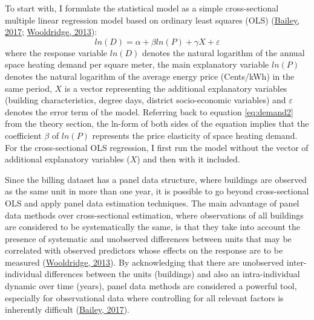 \documentclass[12pt,twoside]{reedthesis}
\begin{document}
To start with, I formulate the statistical model as a simple cross-sectional multiple linear regression model based on ordinary least squares (OLS) (\protect\hyperlink{ref-bailey17}{Bailey, 2017}; \protect\hyperlink{ref-wooldridge13}{Wooldridge, 2013}):
\begin{equation}
ln(D) = \alpha + \beta ln(P) + \gamma X + \varepsilon
\label{eq:ols-eq}
\end{equation}
where the response variable \(ln(D)\) denotes the natural logarithm of the annual space heating demand per square meter, the main explanatory variable \(ln(P)\) denotes the natural logarithm of the average energy price (Cents/kWh) in the same period, \(X\) is a vector representing the additional explanatory variables (building characteristics, degree days, district socio-economic variables) and \(\varepsilon\) denotes the error term of the model. Referring back to equation \eqref{eq:demand2} from the theory section, the ln-form of both sides of the equation implies that the coefficient \(\beta\) of \(ln(P)\) represents the price elasticity of space heating demand. For the cross-sectional OLS regression, I first run the model without the vector of additional explanatory variables (\(X\)) and then with it included.

Since the billing dataset has a panel data structure, where buildings are observed as the same unit in more than one year, it is possible to go beyond cross-sectional OLS and apply panel data estimation techniques. The main advantage of panel data methods over cross-sectional estimation, where observations of all buildings are considered to be systematically the same, is that they take into account the presence of systematic and unobserved differences between units that may be correlated with observed predictors whose effects on the response are to be measured (\protect\hyperlink{ref-wooldridge13}{Wooldridge, 2013}). By acknowledging that there are unobserved inter-individual differences between the units (buildings) and also an intra-individual dynamic over time (years), panel data methods are considered a powerful tool, especially for observational data where controlling for all relevant factors is inherently difficult (\protect\hyperlink{ref-bailey17}{Bailey, 2017}).
\end{document}
